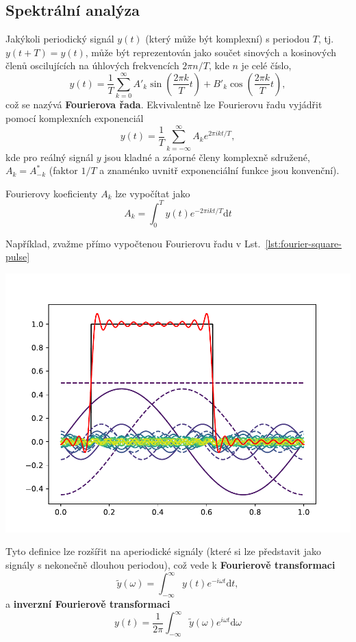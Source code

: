 \subsection{Spektrální analýza}
Jakýkoli periodický signál $y(t)$ (který může být komplexní) s periodou $T$, tj. $y(t + T) = y(t)$, může být reprezentován jako součet sinových a kosinových členů oscilujících na úhlových frekvencích $2\pi n/T$, kde $n$ je celé číslo,
\begin{equation}
    y(t) = \frac{1}{T} \sum_{k=0}^{\infty} A'_k\sin\left(\frac{2\pi k}{T}t\right) + B'_k\cos\left(\frac{2\pi k}{T}t\right),
\end{equation}
což se nazývá \textbf{Fourierova řada}. Ekvivalentně lze Fourierovu řadu vyjádřit pomocí komplexních exponenciál
\begin{equation}
    y(t) = \frac{1}{T} \sum_{k=-\infty}^\infty A_k e^{2\pi ikt/T},
\end{equation}
kde pro reálný signál $y$ jsou kladné a záporné členy komplexně sdružené, $A_k = A_{-k}^*$ (faktor $1/T$ a znaménko uvnitř exponenciální funkce jsou konvenční).

Fourierovy koeficienty $A_k$ lze vypočítat jako
\begin{equation}
    A_k = \int_0^T y(t) e^{-2\pi ikt/T} \mathrm{d}t
\end{equation}

Například, zvažme přímo vypočtenou Fourierovu řadu v Lst.~\ref{lst:fourier-square-pulse}

\begin{center}
    \includegraphics[width=0.5\linewidth]{fourier_series_square_pulse.pdf}
\end{center}

Tyto definice lze rozšířit na aperiodické signály (které si lze představit jako signály s nekonečně dlouhou periodou), což vede k \textbf{Fourierově transformaci}
\begin{equation}
    \tilde y(\omega) = \int_{-\infty}^\infty y(t)e^{-i\omega t} \mathrm{d}t,
\end{equation}
a \textbf{inverzní Fourierově transformaci}
\begin{equation}
    y(t) = \frac{1}{2\pi}\int_{-\infty}^\infty \tilde y (\omega)e^{i\omega t}\mathrm{d}\omega
\end{equation}


